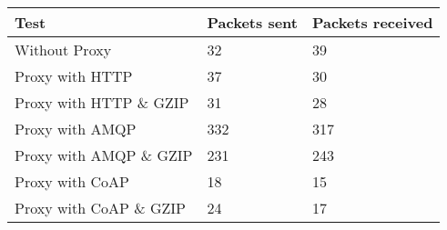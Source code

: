 \begin{tabular}{|l|l|l|}
\hline
\textbf{Test} & \textbf{Packets sent} & \textbf{Packets received} \\ \hline
Without Proxy                    &32         & 39        \\ \hline 
Proxy with HTTP                  &37         & 30        \\ \hline 
Proxy with HTTP \& GZIP          &31         & 28        \\ \hline 
Proxy with AMQP                  &332        & 317       \\ \hline 
Proxy with AMQP \& GZIP          &231        & 243       \\ \hline 
Proxy with CoAP                  &18         & 15        \\ \hline 
Proxy with CoAP \& GZIP          &24         & 17        \\ \hline 
\end{tabular}